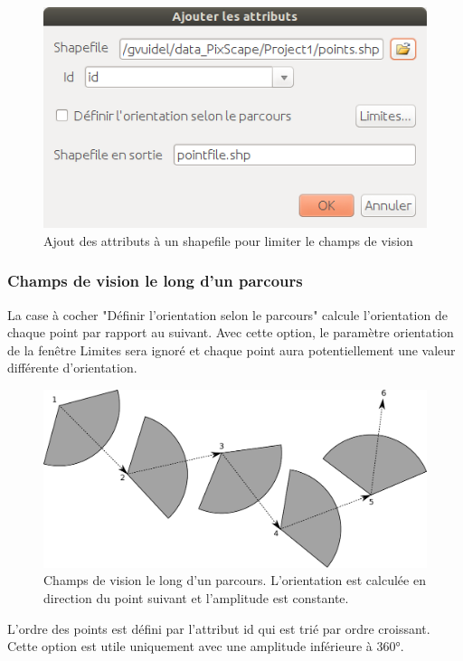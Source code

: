 \documentclass{report}
\begin{document}
\begin{figure}[H]
	\includegraphics[scale=0.5]{img/add_attributes-fr.png} 
	\caption{Ajout des attributs à un shapefile pour limiter le champs de vision}
	\label{add_attributes_dlg}
\end{figure}

\subsubsection{Champs de vision le long d'un parcours}
La case à cocher "Définir l'orientation selon le parcours" calcule l'orientation de chaque point par rapport au suivant. Avec cette option, le paramètre orientation de la fenêtre Limites sera ignoré et chaque point aura potentiellement une valeur différente d'orientation. 

\begin{figure}[H]
	\includegraphics[scale=0.8]{img/path_orien.pdf} 
	\caption{Champs de vision le long d'un parcours. L'orientation est calculée en direction du point suivant et l'amplitude est constante.}
	\label{path_orien}
\end{figure}

L'ordre des points est défini par l'attribut id qui est trié par ordre croissant.
Cette option est utile uniquement avec une amplitude inférieure à 360°.
\end{document}
